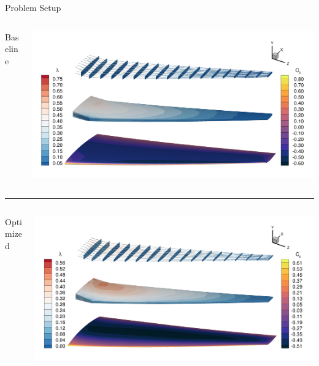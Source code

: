 \documentclass{bredelebeamer}
\begin{document}
\begin{frame}{Problem Setup}
  \begin{columns}
    \begin{column}{0.3\textwidth}
      \begin{center}
        Baseline
      \end{center}
    \end{column}
    \begin{column}{0.7\textwidth}
      \includegraphics[width=1.0\linewidth]{images/aerostruct-resultAnalysis.png}
    \end{column}
  \end{columns}
  \noindent\rule{\textwidth}{1pt}
  \begin{columns}
    \begin{column}{0.3\textwidth}
      \begin{center}
        Optimized
      \end{center}
    \end{column}
    \begin{column}{0.7\textwidth}
      \includegraphics[width=1.0\linewidth]{images/aerostruct-resultOpt.png}
    \end{column}
  \end{columns}
\end{frame}
\end{document}
